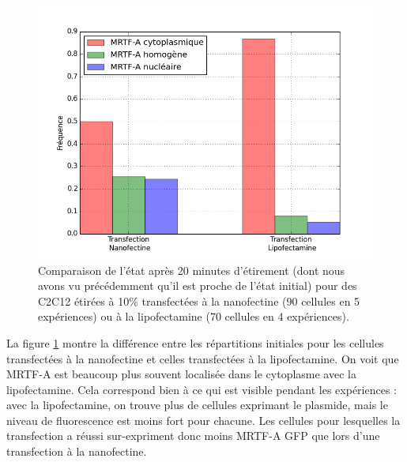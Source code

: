 \begin{figure}
\includegraphics[scale=0.5]{Figures/Lipo_vs_Nano.png}
\caption{Comparaison de l'état après 20 minutes d'étirement (dont nous avons vu précédemment qu'il est proche de l'état initial) pour des C2C12 étirées à 10\% transfectées à la nanofectine (90 cellules en 5 expériences) ou à la lipofectamine (70 cellules en 4 expériences).  \label{LipoNano}}
\end{figure}

La figure \ref{LipoNano} montre la différence entre les répartitions initiales pour les cellules transfectées à la nanofectine et celles transfectées à la lipofectamine. On voit que MRTF-A est beaucoup plus souvent localisée dans le cytoplasme avec la lipofectamine. Cela correspond bien à ce qui est visible pendant les expériences : avec la lipofectamine, on trouve plus de cellules exprimant le plasmide, mais le niveau de fluorescence est moins fort pour chacune. Les cellules pour lesquelles la transfection a réussi sur-expriment donc moins MRTF-A GFP que lors d'une transfection à la nanofectine.

